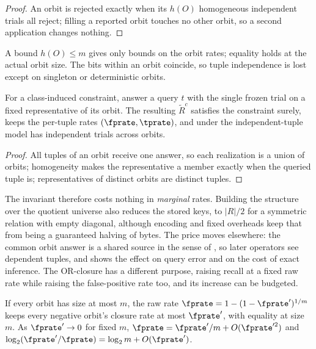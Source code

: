 \begin{proof}
An orbit is rejected exactly when its $h(O)$ homogeneous independent trials all
reject; filling a reported orbit touches no other orbit, so a second application
changes nothing.
\end{proof}

A bound $h(O) \le m$ gives only bounds on the orbit rates; equality holds at the
actual orbit size. The bits within an orbit coincide, so tuple independence is
lost except on singleton or deterministic orbits.

\begin{theorem}
\label{thm:rel-canonical}
For a class-induced constraint, answer a query $t$ with the single frozen trial on
a fixed representative of its orbit. The resulting $\tilde R^{c}$ satisfies the
constraint surely, keeps the per-tuple rates $(\fprate, \tprate)$, and under the
independent-tuple model has independent trials across orbits.
\end{theorem}

\begin{proof}
All tuples of an orbit receive one answer, so each realization is a union of
orbits; homogeneity makes the representative a member exactly when the queried
tuple is; representatives of distinct orbits are distinct tuples.
\end{proof}

The invariant therefore costs nothing in \emph{marginal} rates. Building the
structure over the quotient universe also reduces the stored keys, to $|R|/2$ for a
symmetric relation with empty diagonal, although encoding and fixed overheads keep
that from being a guaranteed halving of bytes. The price moves elsewhere: the
common orbit answer is a shared source in the sense of , so
later operators see dependent tuples, and  shows the
effect on query error and on the cost of exact inference. The OR-closure has a
different purpose, raising recall at a fixed raw rate while raising the
false-positive rate too, and its increase can be budgeted.

\begin{corollary}
\label{cor:rel-rate-budget}
If every orbit has size at most $m$, the raw rate $\fprate = 1 - (1 -
\fprate')^{1/m}$ keeps every negative orbit's closure rate at most $\fprate'$, with
equality at size $m$. As $\fprate' \to 0$ for fixed $m$, $\fprate = \fprate'/m +
O(\fprate'^2)$ and $\log_2(\fprate'/\fprate) = \log_2 m + O(\fprate')$.
\end{corollary}

